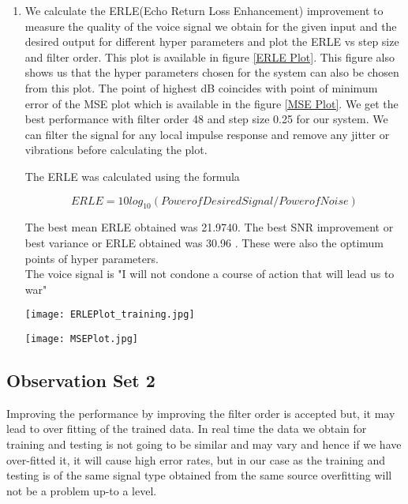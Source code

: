 \documentclass[conference]{IEEEtran}
\begin{document}
\begin{enumerate}
\item We calculate the ERLE(Echo Return Loss Enhancement) improvement to measure the quality of the voice signal we obtain for the given input and the desired output for different hyper parameters and plot the ERLE vs step size and filter order. This plot is available in figure \ref{ERLE Plot}. This figure also shows us that the hyper parameters chosen for the system can also be chosen from this plot. The point of highest dB coincides with point of minimum error of the MSE plot which is available in the figure \ref{MSE Plot}. We get the best performance with filter order 48 and step size 0.25 for our system. We can filter the signal for any local impulse response and remove any jitter or vibrations before calculating the plot.

The ERLE was calculated using the formula 

$$ERLE = 10 log_{10}( Power of Desired Signal /  Power of Noise )$$

The best mean ERLE obtained was 21.9740. The best SNR improvement or  best variance or ERLE obtained was 30.96 . These were also the optimum points of hyper parameters. \\

The voice signal is "I will not condone a course of action that will lead us to war" \\


\begin{figure*}
\centering
\texttt{[image: ERLEPlot\_training.jpg]}
\caption{ERLE vs Hyperparameters}
\label{ERLE Plot}
\end{figure*}


\begin{figure*}
\centering
\texttt{[image: MSEPlot.jpg]}
\caption{MSE vs Hyperparameters}
\label{MSE Plot}
\end{figure*}

\end{enumerate}
\subsection{Observation Set 2}

Improving the performance by improving the filter order is accepted but, it may lead to over fitting of the trained data. In real time the data we obtain for training and testing is not going to be similar and may vary and hence if we have over-fitted it, it will cause high error rates, but in our case as the training and testing is of the same signal type obtained from the same source overfitting will not be a problem up-to a level. \\
\end{document}
